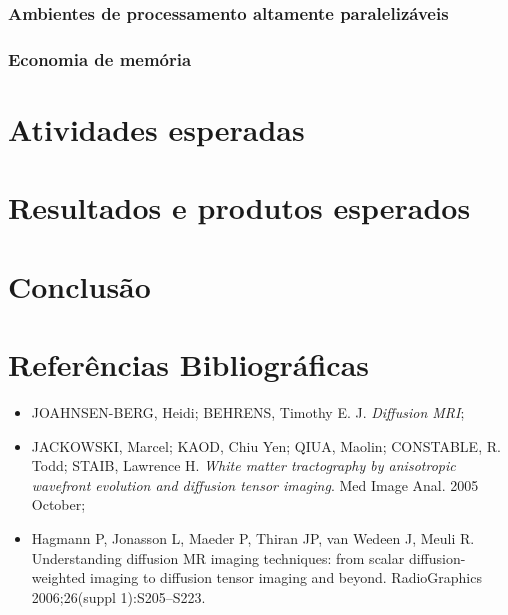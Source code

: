 \documentclass[a4paper,11pt]{report}
\begin{document}
    \subsection{Ambientes de processamento altamente paralelizáveis}
    
    \subsection{Economia de memória}

\chapter{Atividades esperadas}

\chapter{Resultados e produtos esperados}

\chapter{Conclusão}

\chapter{Referências Bibliográficas}

\begin{itemize}
  \item JOAHNSEN-BERG, Heidi; BEHRENS, Timothy E. J. \textit{Diffusion MRI};
  \item JACKOWSKI, Marcel; KAOD, Chiu Yen; QIUA, Maolin; CONSTABLE, R. Todd; STAIB, Lawrence H. \textit{White matter tractography by anisotropic wavefront evolution and diffusion tensor imaging}. Med Image Anal. 2005 October;
  \item Hagmann P, Jonasson L, Maeder P, Thiran JP, van Wedeen J, Meuli R. Understanding diffusion MR imaging techniques: from scalar diffusion-weighted imaging to diffusion tensor imaging and beyond. RadioGraphics 2006;26(suppl 1):S205–S223.
\end{itemize}
\end{document}
